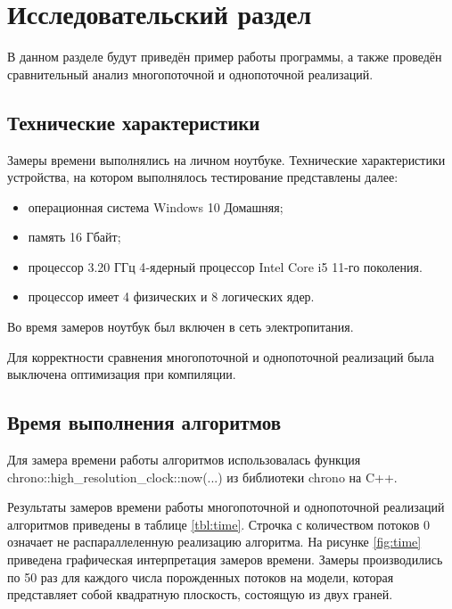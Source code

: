 \chapter{Исследовательский раздел}

В данном разделе будут приведён пример работы программы, а также проведён сравнительный анализ многопоточной и однопоточной реализаций.

\section{Технические характеристики}

Замеры времени выполнялись на личном ноутбуке. Технические характеристики устройства, на котором выполнялось тестирование представлены далее:

\begin{itemize}[label=---]
	\item операционная система Windows 10 Домашняя;
	\item память 16 Гбайт;
	\item процессор 3.20 ГГц 4‑ядерный процессор Intel Core i5 11-го поколения.
	\item процессор имеет 4 физических и 8 логических ядер.
\end{itemize}

Во время замеров ноутбук был включен в сеть электропитания.

Для корректности сравнения многопоточной и однопоточной реализаций была выключена оптимизация при компиляции.

\section{Время выполнения алгоритмов}

Для замера времени работы алгоритмов использовалась функция \linebreak 
chrono::high\_resolution\_clock::now(...) из библиотеки chrono \cite{chrono} на C++.

Результаты замеров времени работы многопоточной и однопоточной реализаций алгоритмов приведены в таблице \ref{tbl:time}. Строчка с количеством потоков 0 означает не распараллеленную реализацию алгоритма. На рисунке \ref{fig:time} приведена графическая интерпретация замеров времени. Замеры производились по 50 раз для каждого числа порожденных потоков на модели, которая представляет собой квадратную плоскость, состоящую из двух граней.  

